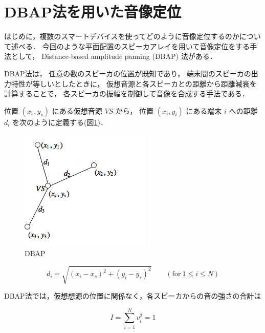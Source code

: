 
\section{DBAP法を用いた音像定位}

はじめに，複数のスマートデバイスを使ってどのように音像定位するのかについて述べる．
今回のような平面配置のスピーカアレイを用いて音像定位をする手法として，
Distance-based amplitude panning (DBAP) 法\cite{dbap}がある．

DBAP法は，
任意の数のスピーカの位置が既知であり，
端末間のスピーカの出力特性が等しいとしたときに，
仮想音源と各スピーカとの距離から距離減衰を計算することで，
各スピーカの振幅を制御して音像を合成する手法である．

位置 $(x_s,y_s)$ にある仮想音源 $VS$ から，
位置 $(x_i,y_i)$ にある端末 $i$ への距離 $d_i$ を次のように定義する(図\ref{fig:DBAP})．

\begin{figure}[p]\centering
  \hspace{-2mm}\includegraphics[clip,width=1.1\hsize]{img/DBAP.png}
  \caption{DBAP}\label{fig:DBAP}
\end{figure}

$$
d_i = \sqrt{(x_i - x_s)^2 + (y_i - y_s)^2} \qquad (\mathrm{for}\ 1 \leq i \leq N)
$$

DBAP法では，仮想想源の位置に関係なく，各スピーカからの音の強さの合計は

$$
I = \sum_{i=1}^N v_i^2 = 1
$$

